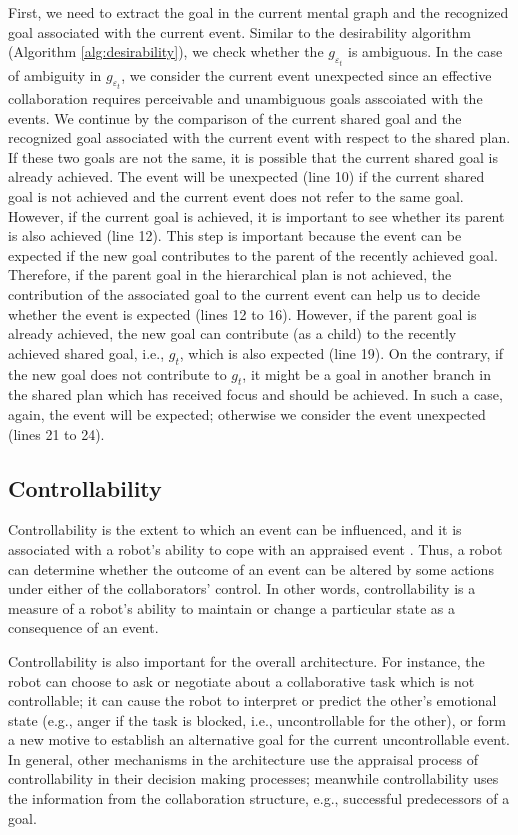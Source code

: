 \documentclass[letterpaper]{article}
\begin{document}
First, we need to extract the goal in the current mental graph and the
recognized goal associated with the current event. Similar to the desirability
algorithm (Algorithm \ref{alg:desirability}), we check whether the
$\mathit{g}_{\varepsilon_t}$ is ambiguous. In the case of ambiguity in
$\mathit{g}_{\varepsilon_t}$, we consider the current event unexpected since an
effective collaboration requires perceivable and unambiguous goals asscoiated
with the events. We continue by the comparison of the current shared goal and
the recognized goal associated with the current event with respect to the shared
plan. If these two goals are not the same, it is possible that the current
shared goal is already achieved. The event will be unexpected (line 10) if the
current shared goal is not achieved and the current event does not refer to the
same goal. However, if the current goal is achieved, it is important to see
whether its parent is also achieved (line 12). This step is important because
the event can be expected if the new goal contributes to the parent of the
recently achieved goal. Therefore, if the parent goal in the hierarchical plan
is not achieved, the contribution of the associated goal to the current event
can help us to decide whether the event is expected (lines 12 to 16). However,
if the parent goal is already achieved, the new goal can contribute (as a child)
to the recently achieved shared goal, i.e., $\mathit{g}_{t}$, which is also
expected (line 19). On the contrary, if the new goal does not contribute to
$\mathit{g}_{t}$, it might be a goal in another branch in the shared plan which
has received focus and should be achieved. In such a case, again, the event will
be expected; otherwise we consider the event unexpected (lines 21 to 24).

\subsection{Controllability}

Controllability is the extent to which an event can be influenced, and it is
associated with a robot's ability to cope with an appraised event
\cite{gratch:domain-independent}. Thus, a robot can determine whether the
outcome of an event can be altered by some actions under either of the
collaborators' control. In other words, controllability is a measure of a
robot's ability to maintain or change a particular state as a consequence of an
event.

Controllability is also important for the overall architecture. For instance,
the robot can choose to ask or negotiate about a collaborative task which is
not controllable; it can cause the robot to interpret or predict the other's
emotional state (e.g., anger if the task is blocked, i.e., uncontrollable for
the other), or form a new motive to establish an alternative goal for the
current uncontrollable event. In general, other mechanisms in the architecture
use the appraisal process of controllability in their decision making processes;
meanwhile controllability uses the information from the collaboration structure,
e.g., successful predecessors of a goal.
\end{document}
